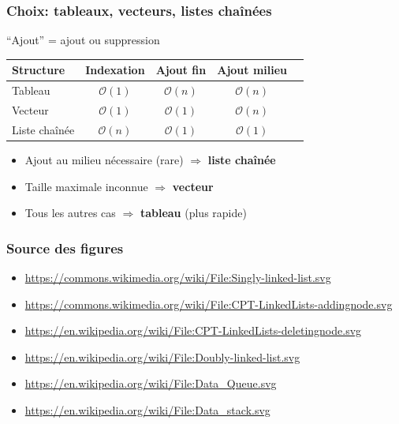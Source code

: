 \documentclass[12pt]{beamer}
\newcommand{\bigoh}[1]{\mathcal{O}\left(#1\right)}
\newcommand{\constant}{\bigoh{1}}
\newcommand{\linear}{\bigoh{n}}
\begin{document}
\begin{frame}
\frametitle{Choix: tableaux, vecteurs, listes chaînées}
``Ajout'' = ajout ou suppression
\begin{center}
\begin{tabu}{l|cccc}
\toprule
Structure & Indexation & Ajout fin & Ajout milieu \\
\midrule
Tableau & $\constant$ & $\linear$ & $\linear$ \\
Vecteur & $\constant$ & $\constant$ & $\linear$ \\
Liste chaînée & $\linear$ & $\constant$ & $\constant$ \\
\bottomrule
\end{tabu}
\end{center}
\begin{itemize}
\item Ajout au milieu nécessaire (rare) $\Rightarrow$ \textbf{liste chaînée}
\item Taille maximale inconnue $\Rightarrow$ \textbf{vecteur}
\item Tous les autres cas $\Rightarrow$ \textbf{tableau} (plus rapide)
\end{itemize}
\end{frame}

\begin{frame}
\frametitle{Source des figures}
\begin{itemize}
\item \url{https://commons.wikimedia.org/wiki/File:Singly-linked-list.svg}
\item \url{https://commons.wikimedia.org/wiki/File:CPT-LinkedLists-addingnode.svg}
\item \url{https://en.wikipedia.org/wiki/File:CPT-LinkedLists-deletingnode.svg}
\item \url{https://en.wikipedia.org/wiki/File:Doubly-linked-list.svg}
\item \url{https://en.wikipedia.org/wiki/File:Data_Queue.svg}
\item \url{https://en.wikipedia.org/wiki/File:Data_stack.svg}
\end{itemize}
\end{frame}
\end{document}
